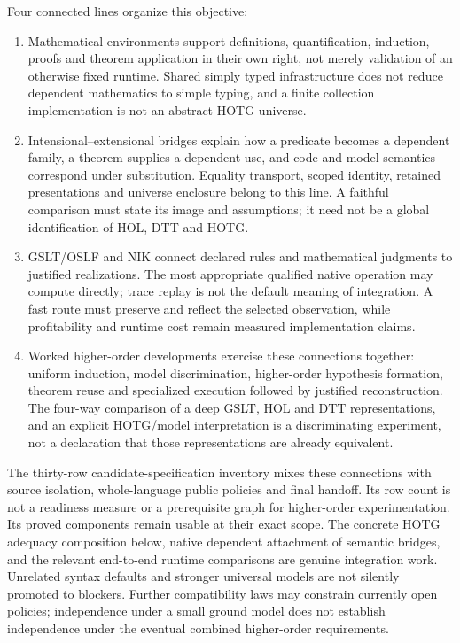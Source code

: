 \documentclass[11pt]{article}
\theoremstyle{definition}
\theoremstyle{remark}
\begin{document}
Four connected lines organize this objective:
\begin{enumerate}[leftmargin=*]
\item Mathematical environments support definitions, quantification, induction,
  proofs and theorem application in their own right, not merely validation of
  an otherwise fixed runtime. Shared simply typed infrastructure does not
  reduce dependent mathematics to simple typing, and a finite collection
  implementation is not an abstract HOTG universe.
\item Intensional--extensional bridges explain how a predicate becomes a
  dependent family, a theorem supplies a dependent use, and code and model
  semantics correspond under substitution. Equality transport, scoped identity,
  retained presentations and universe enclosure belong to this line. A
  faithful comparison must state its image and assumptions; it need not be a
  global identification of HOL, DTT and HOTG.
\item GSLT/OSLF and NIK connect declared rules and mathematical judgments to
  justified realizations. The most appropriate qualified native operation may
  compute directly; trace replay is not the default meaning of integration.
  A fast route must preserve and reflect the selected observation, while
  profitability and runtime cost remain measured implementation claims.
\item Worked higher-order developments exercise these connections together:
  uniform induction, model discrimination, higher-order hypothesis formation,
  theorem reuse and specialized execution followed by justified reconstruction.
  The four-way comparison of a deep GSLT, HOL and DTT representations, and an
  explicit HOTG/model interpretation is a discriminating experiment, not a
  declaration that those representations are already equivalent.
\end{enumerate}

The thirty-row candidate-specification inventory mixes these connections with
source isolation, whole-language public policies and final handoff. Its row
count is not a readiness measure or a prerequisite graph for higher-order
experimentation. Its proved components remain usable at their exact scope.
The concrete HOTG adequacy composition below, native dependent attachment of
semantic bridges, and the relevant end-to-end runtime comparisons are genuine
integration work. Unrelated syntax defaults and stronger universal models are
not silently promoted to blockers. Further compatibility laws may constrain
currently open policies; independence under a small ground model does not
establish independence under the eventual combined higher-order requirements.
\end{document}
